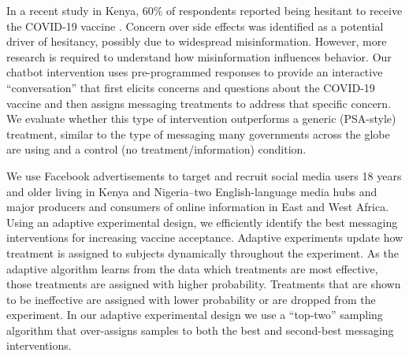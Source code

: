 \documentclass[letterpaper, 12pt, parskip=full,DIV=10]{scrartcl}
\begin{document}
In a recent study in Kenya, 60\% of respondents reported being hesitant to receive the COVID-19 vaccine \citep{orangi2021assessing}. Concern over side effects was identified as a potential driver of hesitancy, possibly due to widespread misinformation. However, more research is required to understand how misinformation influences behavior. Our chatbot intervention uses pre-programmed responses to provide an interactive ``conversation'' that first elicits concerns and questions about the COVID-19 vaccine and then assigns messaging treatments to address that specific concern. We evaluate whether this type of intervention outperforms a generic (PSA-style) treatment, similar to the type of messaging many governments across the globe are using and a control (no treatment/information) condition.

We use Facebook advertisements to target and recruit social media users 18 years and older living in Kenya and Nigeria--two English-language media hubs and major producers and consumers of online information in East and West Africa. Using an adaptive experimental design, we efficiently identify the best messaging interventions for increasing vaccine acceptance. Adaptive experiments update how treatment is assigned to subjects dynamically throughout the experiment. As the adaptive algorithm learns from the data which treatments are most effective, those treatments are assigned with higher probability. Treatments that are shown to be ineffective are assigned with lower probability or are dropped from the experiment. In our adaptive experimental design we use a ``top-two'' sampling algorithm that over-assigns samples to both the best and second-best messaging interventions. %
\end{document}
